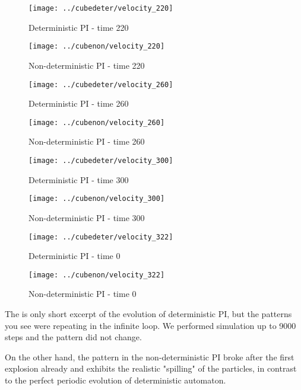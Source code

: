 \begin{figure}[H]
 \centering 
 \texttt{[image: ../cubedeter/velocity\_220]}
 \caption{Deterministic PI - time 220}
\end{figure}

\begin{figure}[H]
 \centering 
 \texttt{[image: ../cubenon/velocity\_220]}
 \caption{Non-deterministic PI - time 220}
\end{figure}

\begin{figure}[H]
 \centering 
 \texttt{[image: ../cubedeter/velocity\_260]}
 \caption{Deterministic PI - time 260}
\end{figure}

\begin{figure}[H]
 \centering 
 \texttt{[image: ../cubenon/velocity\_260]}
 \caption{Non-deterministic PI - time 260}
\end{figure}

\begin{figure}[H]
 \centering 
 \texttt{[image: ../cubedeter/velocity\_300]}
 \caption{Deterministic PI - time 300}
\end{figure}

\begin{figure}[H]
 \centering 
 \texttt{[image: ../cubenon/velocity\_300]}
 \caption{Non-deterministic PI - time 300}
\end{figure}

\begin{figure}[H]
 \centering 
 \texttt{[image: ../cubedeter/velocity\_322]}
 \caption{Deterministic PI - time 0}
\end{figure}

\begin{figure}[H]
 \centering 
 \texttt{[image: ../cubenon/velocity\_322]}
 \caption{Non-deterministic PI - time 0}
\end{figure}


The is only short excerpt of the evolution of deterministic PI, but the patterns you see were repeating in the infinite loop. We performed simulation up to 9000 steps and the pattern did not change.

On the other hand, the pattern in the non-deterministic PI broke after the first explosion already and exhibits the realistic "spilling" of the particles, in contrast to the perfect periodic evolution of deterministic automaton.
